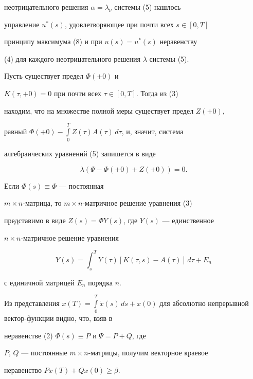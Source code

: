 неотрицательного решения $\alpha=\lambda_\nu$ системы (5) нашлось


управление $u^*(s)$, удовлетворяющее при почти всех $s\in [0,T]$


принципу максимума (8) и при $u(s) = u^*(s)$ неравенству


(4) для каждого неотрицательного решения $\lambda$ системы (5).


\medskip





\begin{note}


Пусть существует предел $\Phi(+0)$ и


$K(\tau,+0) = 0$ при почти всех $\tau\in [0,T]$. Тогда из (3)


находим, что на множестве полной меры существует предел $Z(+0)$,


равный $\Phi(+0) - \int\limits_0^T Z(\tau)A(\tau)\,d\tau$, и, значит, система


алгебраических уравнений (5) запишется в виде


$$


\lambda(\Psi - \Phi(+0) + Z(+0)) = 0. 


$$


\end{note}





\begin{note}


Если $\Phi(s)\equiv \Phi$ --- постоянная


$m\times n$-матрица, то $m\times n$-матричное решение уравнения (3)


представимо в виде $Z(s) = \Phi Y(s)$, где $Y(s)$ --- единственное


$n\times n$-матричное решение уравнения


$$


Y(s) = \int_s^T Y(\tau)[K(\tau,s) - A(\tau)]\,d\tau + E_n


$$


с единичной матрицей $E_n$ порядка $n$.


\end{note}





\begin{note}


Из представления $x(T) = \int\limits_0^T\Dot x(s)\,ds


+ x(0)$ для абсолютно непрерывной вектор-функции видно, что, взяв в


неравенстве (2)\; $\Phi(s)\equiv P$ и $\Psi = P + Q$, где


$P$, $Q$ --- постоянные $m\times n$-матрицы, получим векторное краевое


неравенство $Px(T) + Qx(0)\ge\beta$. 


\end{note}








